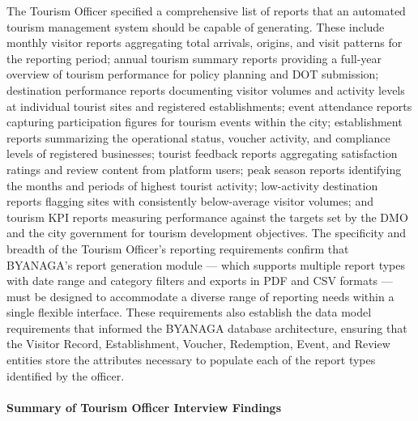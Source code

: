 \documentclass{research}
\begin{document}
The Tourism Officer specified a comprehensive list of reports that an
automated tourism management system should be capable of generating.
These include monthly visitor reports aggregating total arrivals, origins,
and visit patterns for the reporting period; annual tourism summary reports
providing a full-year overview of tourism performance for policy planning
and DOT submission; destination performance reports documenting visitor
volumes and activity levels at individual tourist sites and registered
establishments; event attendance reports capturing participation figures
for tourism events within the city; establishment reports summarizing the
operational status, voucher activity, and compliance levels of registered
businesses; tourist feedback reports aggregating satisfaction ratings and
review content from platform users; peak season reports identifying the
months and periods of highest tourist activity; low-activity destination
reports flagging sites with consistently below-average visitor volumes;
and tourism KPI reports measuring performance against the targets set
by the DMO and the city government for tourism development objectives.
The specificity and breadth of the Tourism Officer's reporting requirements
confirm that BYANAGA's report generation module --- which supports
multiple report types with date range and category filters and exports
in PDF and CSV formats --- must be designed to accommodate a diverse
range of reporting needs within a single flexible interface. These
requirements also establish the data model requirements that informed
the BYANAGA database architecture, ensuring that the Visitor Record,
Establishment, Voucher, Redemption, Event, and Review entities store
the attributes necessary to populate each of the report types identified
by the officer.


\paragraph{Summary of Tourism Officer Interview Findings}
\end{document}
